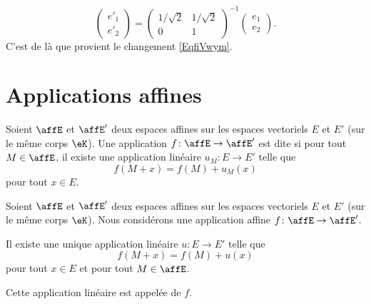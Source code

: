\begin{example}
\begin{equation}
        \begin{pmatrix}
            e'_1    \\
            e'_2
        \end{pmatrix}=\begin{pmatrix}
            1/\sqrt{2}    &   1/\sqrt{2}    \\
            0    &   1
        \end{pmatrix}^{-1}\begin{pmatrix}
            e_1    \\
            e_2
        \end{pmatrix}.
    \end{equation}
    C'est de là que provient le changement \eqref{EqfiVwym}.
\end{example}

\section{Applications affines}

\begin{definition}      \label{DEFooUAWZooXcMKve}
    Soient \( \affE\) et \( \affE'\) deux espaces affines sur les espaces vectoriels \( E\) et \( E'\) (sur le même corps \( \eK\)). Une application \( f\colon \affE\to \affE'\) est dite  si pour tout \( M\in \affE\), il existe une application linéaire \( u_M\colon E\to E'\) telle que
    \begin{equation}    \label{EqMqIoWX}
        f(M+x)=f(M)+u_M(x)
    \end{equation}
    pour tout \( x\in E\).
\end{definition}

\begin{lemmaDef}       \label{LEMooYJCDooOGAHkF}
    Soient \( \affE\) et \( \affE'\) deux espaces affines sur les espaces vectoriels \( E\) et \( E'\) (sur le même corps \( \eK\)). Nous considérons une application affine \( f\colon \affE\to \affE'\).

    Il existe une unique application linéaire \( u\colon E\to E'\) telle que
    \begin{equation}
        f(M+x)=f(M)+u(x)
    \end{equation}
    pour tout \( x\in E\) et pour tout \( M\in \affE\).

    Cette application linéaire est appelée  de \( f\).
\end{lemmaDef}

